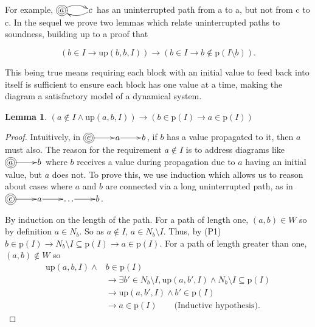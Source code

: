 \documentclass[twocolumn]{article}
\newtheorem{lemma}{Lemma}
\newcommand*{\Inputs}[1]{N_{#1}}
\begin{document}
For example, $\xymatrix@1{*++++[o][F=]{a} \ar@/^/[r] & c \ar@/^/[l]}$ has an uninterrupted path from a to a, but not from c to c. In the sequel we prove two lemmas which relate uninterrupted paths to soundness, building up to a proof that

\[
(b\in I \rightarrow \text{up}(b, b, I))
\rightarrow (b\in I\rightarrow b\not\in\text{p}(I\setminus b)).
\]

This being true means requiring each block with an initial value to feed back into itself is sufficient to ensure each block has one value at a time, making the diagram a satisfactory model of a dynamical system.

\begin{lemma} \label{lem:upp}
  $(a \not\in I \land \text{up}(a, b, I)) \rightarrow (b\in\text{p}(I) \rightarrow a\in\text{p}(I))$
\end{lemma}
\begin{proof}
    Intuitively, in $\xymatrix@1{*++++[o][F=]{e} \ar[r] & a \ar[r] & b}$, if $b$ has a value propagated to it, then $a$ must also. The reason for the requirement $a\not\in I$ is to address diagrams like $\xymatrix@1{*++++[o][F=]{a} \ar[r] & b}$ where $b$ receives a value during propagation due to $a$ having an initial value, but $a$ does not. To prove this, we use induction which allows us to reason about cases where $a$ and $b$ are connected via a long uninterrupted path, as in $\xymatrix@1{*++++[o][F=]{e} \ar[r] & a \ar[r] & \dots \ar[r] & b}$.

  By induction on the length of the path. For a path of length one, $(a, b)\in W$ so by definition $a\in\Inputs{b}$. So as $a\not\in I$, $a\in\Inputs{b}\setminus I$. Thus, by (P1) $b\in\text{p}(I)\rightarrow \Inputs{b}\setminus I\subseteq\text{p}(I)\rightarrow a\in\text{p}(I)$. For a path of length greater than one, $(a, b)\not\in W$ so
  \[
  \begin{aligned}
      \text{up}(a, b, I)\land &b\in\text{p}(I)  \\ 
      &\rightarrow \exists b'\in\Inputs{b}\setminus I, \text{up}(a, b', I) \land \Inputs{b}\setminus I\subseteq\text{p}(I) \\
      &\rightarrow \text{up}(a, b', I) \land b'\in\text{p}(I) \\
      &\rightarrow a\in\text{p}(I) \quad\quad\text{(Inductive hypothesis).}
  \end{aligned}
  \]
\end{proof}
\end{document}
